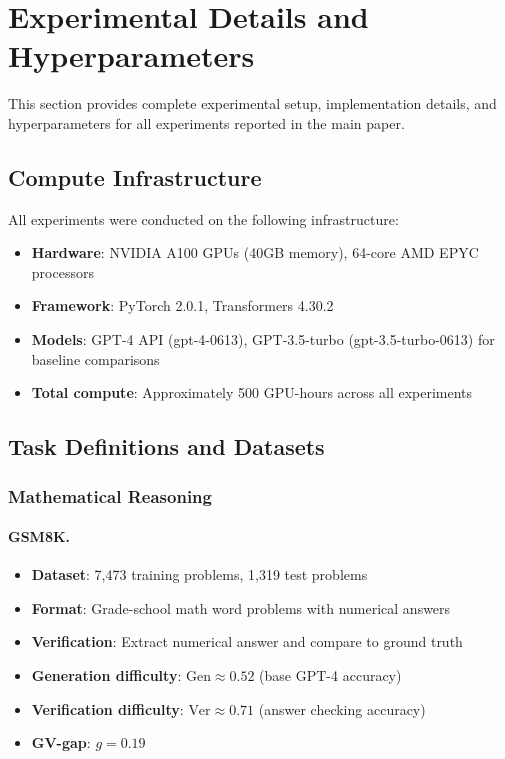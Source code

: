 \documentclass{article}
\theoremstyle{definition}
\theoremstyle{remark}
\newcommand{\Gen}{\text{Gen}}
\newcommand{\Ver}{\text{Ver}}
\begin{document}
\section{Experimental Details and Hyperparameters}
\label{sec:experimental-details}

This section provides complete experimental setup, implementation details, and hyperparameters for all experiments reported in the main paper.

\subsection{Compute Infrastructure}

All experiments were conducted on the following infrastructure:
\begin{itemize}
\item \textbf{Hardware}: NVIDIA A100 GPUs (40GB memory), 64-core AMD EPYC processors
\item \textbf{Framework}: PyTorch 2.0.1, Transformers 4.30.2
\item \textbf{Models}: GPT-4 API (gpt-4-0613), GPT-3.5-turbo (gpt-3.5-turbo-0613) for baseline comparisons
\item \textbf{Total compute}: Approximately 500 GPU-hours across all experiments
\end{itemize}

\subsection{Task Definitions and Datasets}

\subsubsection{Mathematical Reasoning}

\paragraph{GSM8K.}
\begin{itemize}
\item \textbf{Dataset}: 7,473 training problems, 1,319 test problems
\item \textbf{Format}: Grade-school math word problems with numerical answers
\item \textbf{Verification}: Extract numerical answer and compare to ground truth
\item \textbf{Generation difficulty}: \(\Gen \approx 0.52\) (base GPT-4 accuracy)
\item \textbf{Verification difficulty}: \(\Ver \approx 0.71\) (answer checking accuracy)
\item \textbf{GV-gap}: \(g = 0.19\)
\end{itemize}
\end{document}
